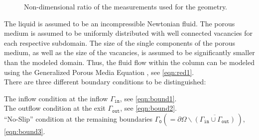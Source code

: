 \documentclass{article}
\begin{document}
\begin{figure}[!h]

\vspace{-20pt}
\caption{Non-dimensional ratio of the measurements used for the geometry.}
\label{fig:geomnodim}
\end{figure}

The liquid is assumed to be an incompressible Newtonian fluid. The porous medium is assumed to be uniformly distributed with well connected vacancies for each respective subdomain. The size of the single components of the porous medium, as well as the size of the vacancies, is assumed to be significantly smaller than the modeled domain. Thus, the fluid flow within the column can be modeled using the Generalized Porous Media Equation  \cite{Blunck}, see \eqref{eqn:red1}.\\
There are three different boundary conditions to be distinguished:

\vspace*{10pt}\hspace*{20pt} The inflow condition at the inflow $\Gamma_{\texttt{in}}$, see \eqref{eqn:bound1}.\\
\hspace*{20pt} The outflow condition at the exit $\Gamma_{\texttt{out}}$, see \eqref{eqn:bound2}.\\
``No-Slip'' condition at the remaining boundaries $\Gamma_{\texttt{0}}(=\partial \Omega \backslash \overline{(\Gamma_{\texttt{in}} \cup \Gamma_{\texttt{out}})}\,)$, \eqref{eqn:bound3}. 
\end{document}
